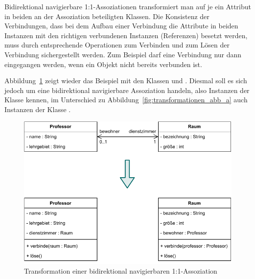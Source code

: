 \pagebreak %


\vspace{2mm} %

Bidirektional navigierbare 1:1-Assoziationen transformiert man auf je ein Attribut in beiden an der Assoziation beteiligten Klassen. Die Konsistenz der Verbindungen, \zb dass bei dem Aufbau einer Verbindung die Attribute in beiden Instanzen mit den richtigen verbundenen Instanzen (Referenzen) besetzt werden, muss durch entsprechende Operationen zum Verbinden und zum Lösen der Verbindung sichergestellt werden. Zum Beispiel darf eine Verbindung nur dann eingegangen werden, wenn ein Objekt nicht bereits verbunden ist.

\vspace{2mm} %

Abbildung~\ref{fig:transformationen_abb_b} zeigt wieder das Beispiel mit den Klassen  und . Diesmal soll es sich jedoch um eine bidirektional navigierbare Assoziation handeln, also Instanzen der Klasse  kennen, im Unterschied zu Abbildung~\ref{fig:transformationen_abb_a} auch Instanzen der Klasse .

\begin{figure}[h!]
	\centering
	\includegraphics[scale=1.0]{Bilder/Kapitel-9/transformationen_abb_b.pdf}
	\vspace{\baselineskip} %
	\caption{Transformation einer bidirektional navigierbaren 1:1-Assoziation}
	\label{fig:transformationen_abb_b}
\end{figure}

